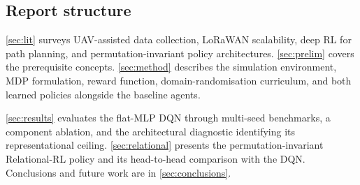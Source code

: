 \subsection{Report structure}

\autoref{sec:lit} surveys UAV-assisted data collection, LoRaWAN scalability, deep RL for path planning, and permutation-invariant policy architectures. \autoref{sec:prelim} covers the prerequisite concepts. \autoref{sec:method} describes the simulation environment, MDP formulation, reward function, domain-randomisation curriculum, and both learned policies alongside the baseline agents.

\autoref{sec:results} evaluates the flat-MLP DQN through multi-seed benchmarks, a component ablation, and the architectural diagnostic identifying its representational ceiling. \autoref{sec:relational} presents the permutation-invariant Relational-RL policy and its head-to-head comparison with the DQN. Conclusions and future work are in \autoref{sec:conclusions}.
